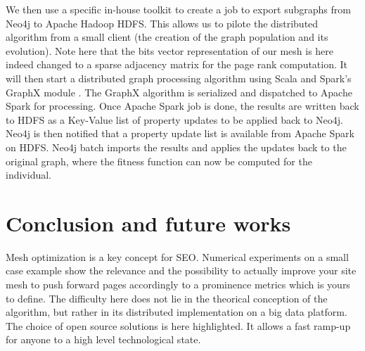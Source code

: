 \documentclass{iSWAGArticle}
\begin{document}
  We then use a specific in-house toolkit to create a job to export subgraphs from Neo4j to Apache Hadoop HDFS.
  This allows us to pilote the distributed algorithm from a small client (the creation of the graph population and its evolution). Note here that
  the bits vector representation of our mesh is here indeed changed to a sparse adjacency matrix for the page rank computation.
  It will then start a distributed graph processing algorithm using Scala \cite{scala} and Spark's GraphX module \cite{graphX}. 
  The GraphX algorithm is serialized and dispatched to Apache Spark for processing.
  Once Apache Spark job is done, the results are written back to HDFS as a Key-Value list of property updates to be applied back to Neo4j.
  Neo4j is then notified that a property update list is available from Apache Spark on HDFS. Neo4j batch imports the results and applies the updates back to the original graph,
  where the fitness function can now be computed for the individual.
  \section{Conclusion and future works}
  Mesh optimization is a key concept for SEO. Numerical experiments on a small case example show the relevance and the possibility to actually improve your site mesh
  to push forward pages accordingly to a prominence metrics which is yours to define. The difficulty here does not lie in the
  theorical conception of the algorithm, but rather in its distributed implementation on a big data platform. The choice of open source solutions
  is here highlighted. It allows a fast ramp-up for anyone to a high level technological state.
  \nocite{*}
  
  
  
\end{document}
